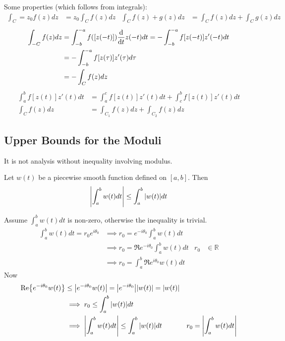 \documentclass[12pt, english]{book}
\makeatletter
\renewenvironment{proof}[1][\proofname]{\par
	\pushQED{\qed}%
	\normalfont \topsep6\p@\@plus6\p@\relax
	\list{}{%
		\settowidth{\leftmargin}{\itshape\proofname:\hskip\labelsep}%
		\setlength{\labelwidth}{0pt}%
		\setlength{\itemindent}{-\leftmargin}%
		}%
	\item[\hskip\labelsep\itshape#1\@addpunct{:}]\ignorespaces
	}{\popQED\endlist\@endpefalse}
\makeatother
\begin{document}
	Some properties (which follows from integrals):
	\begin{align*}
		\int_{C} = z_0 f(z) dz &= z_0 \int_{C} f(z) dz &
		\int_{C} f(z) + g(z) dz &= \int_{C} f(z) dz + \int_{C} g(z) dz 
	\end{align*}
	\begin{align*}
		\int_{-C} f(z) dz 
		&= \int_{-b}^{-a} f([z(-t)]) \dv{t} z(-t) dt = -\int_{-b}^{-a} f[z(-t)] z'(-t) dt \\
		&= -\int_{-b}^{-a} f[z(\tau)] z'(\tau) d\tau \\
		&= -\int_{C} f(z) dz
	\end{align*}
	\begin{align*}
		\int_{a}^{b} f[z(t)] z'(t) dt &= \int_{a}^{c} f[z(t)] z'(t) dt + \int_{c}^{b} f[z(t)] z'(t) dt\\
		\int_{C} f(z) dz &= \int_{C_1} f(z) dz + \int_{C_2} f(z) dz
	\end{align*}
	
	\subsection{Upper Bounds for the Moduli} \label{Upper Bounds for the Moduli Subsection - Complex}
	
	It is not analysis without inequality involving modulus.
	
	\begin{lemma}
		Let \(w(t)\) be a piecewise smooth function defined on \([a,b]\). Then
		\begin{align*}
			\abs{ \int_{a}^{b} w(t) dt} \leq \int_{a}^{b} \abs{w(t)} dt
		\end{align*}
	\end{lemma}
	\begin{proof}
		Assume \(\int_{a}^{b} w(t) dt\) is non-zero, otherwise the inequality is trivial. 
		\begin{align*}
			\int_{a}^{b} w(t) dt = r_0 e^{i\theta_0}
				&\implies r_0 = e^{-i\theta_0} \int_{a}^{b} w(t) dt\\
				&\implies r_0 = \Re{e^{-i\theta_0} \int_{a}^{b} w(t) dt} & r_0 &\in \mathbb{R} \\
				&\implies r_0 = \int_{a}^{b} \Re{e^{i\theta_0} w(t)} dt
		\end{align*}
		Now
		\begin{align*}
			\Re{e^{-i\theta_0} w(t)} 
			&\leq \abs{e^{-i\theta_0} w(t)} = \abs{e^{-i\theta_0}} \abs{w(t)} = \abs{w(t)} \\
			&\implies r_0 \leq \int_{a}^{b} \abs{w(t)} dt \\
			&\implies \abs{ \int_{a}^{b} w(t) dt} \leq \int_{a}^{b} \abs{w(t)} dt
				& r_0 = \abs{ \int_{a}^{b} w(t) dt}
		\end{align*}
	\end{proof}
	
\end{document}

